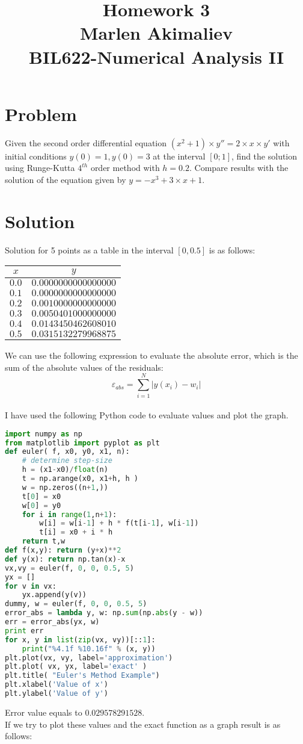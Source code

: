 \documentclass[a4paper,10pt]{article}
\date{\displaydate{date}}
\title{Homework 3\\Marlen Akimaliev\\BIL622-Numerical Analysis II}
\begin{document}
\maketitle

\section{Problem}
Given the second order differential equation $(x^2+1)\times y'' = 2 \times x \times y'$ with initial conditions $y(0)=1, y(0)=3$ at the interval $[0;1]$, find the solution using Runge-Kutta $4^{th}$ order method with $h=0.2$. Compare results with the solution of the equation given by $y = -x^3+3 \times x +1$.
\section{Solution}
Solution for 5 points as a table in the interval $[0, 0.5]$ is as follows:
\begin{center}
\begin{tabular}{ |c|c| } 
 \hline
 $x$ & $y$\\
\hline
 $0.0$ & $0.0000000000000000$\\
 $0.1$ & $0.0000000000000000$\\
 $0.2$ & $0.0010000000000000$\\
 $0.3$ & $0.0050401000000000$\\
 $0.4$ & $0.0143450462608010$\\
 $0.5$ & $0.0315132279968875$\\
 \hline
\end{tabular}
\end{center}
We can use the following expression to evaluate the absolute error, which is the sum of the absolute values of the residuals:\\
$$\varepsilon_{abs} = \sum_{i=1}^{N} |y(x_i)-w_i|$$\\
I have used the following Python code \cite{connor} to evaluate values and plot the graph.
\begin{lstlisting}[language=Python]
import numpy as np
from matplotlib import pyplot as plt
def euler( f, x0, y0, x1, n):
	# determine step-size
	h = (x1-x0)/float(n)             
	t = np.arange(x0, x1+h, h )         
	w = np.zeros((n+1,))                     
	t[0] = x0
	w[0] = y0   
	for i in range(1,n+1):                       
		w[i] = w[i-1] + h * f(t[i-1], w[i-1])
		t[i] = x0 + i * h
	return t,w
def f(x,y): return (y+x)**2
def y(x): return np.tan(x)-x
vx,vy = euler(f, 0, 0, 0.5, 5)
yx = []
for v in vx:
	yx.append(y(v))
dummy, w = euler(f, 0, 0, 0.5, 5)
error_abs = lambda y, w: np.sum(np.abs(y - w))
err = error_abs(yx, w)
print err
for x, y in list(zip(vx, vy))[::1]:
    print("%4.1f %10.16f" % (x, y))
plt.plot(vx, vy, label='approximation')
plt.plot( vx, yx, label='exact' )
plt.title( "Euler's Method Example")
plt.xlabel('Value of x') 
plt.ylabel('Value of y')
\end{lstlisting}
Error value equals to $0.029578291528$.\\
If we try to plot these values and the exact function as a graph result is as follows:
\end{document}
